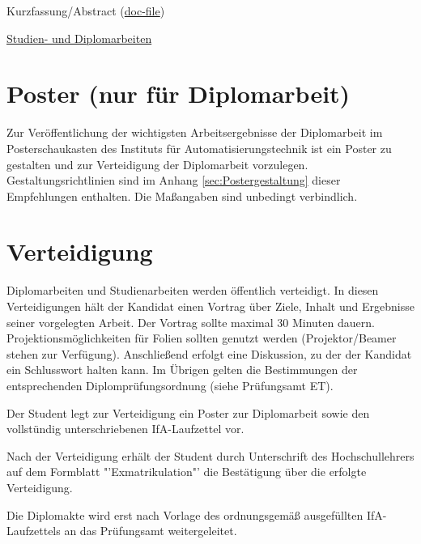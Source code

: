 \begin{compactitem}
  \item Kurzfassung/Abstract (\href{http://www.et.tu-dresden.de/ifa/fileadmin/user_upload/www_files/richtlinien_sa_da/DA_SA_Kurzfassung_Abstract.doc}{doc-file})
\end{compactitem}

\begin{compactitem}
  \item \href{http://www.et.tu-dresden.de/typo3/ifa/index.php?id=710}{Studien- und Diplomarbeiten }
\end{compactitem}


\section{Poster (nur für Diplomarbeit)}
\label{sec:PosterNurFuerDiplomarbeit}

Zur Veröffentlichung der wichtigsten Arbeitsergebnisse der Diplomarbeit im Posterschaukasten des Instituts für Automatisierungstechnik ist ein Poster zu gestalten und zur Verteidigung der Diplomarbeit vorzulegen. Gestaltungsrichtlinien sind im Anhang \ref{sec:Postergestaltung} dieser Empfehlungen enthalten. Die Maßangaben sind unbedingt verbindlich.


\section{Verteidigung}
\label{sec:Verteidigung}

Diplomarbeiten und Studienarbeiten werden öffentlich verteidigt. In diesen Verteidigungen hält der Kandidat einen Vortrag über Ziele, Inhalt und Ergebnisse seiner vorgelegten Arbeit. Der Vortrag sollte maximal 30 Minuten dauern. Projektionsmöglichkeiten für Folien sollten genutzt werden (Projektor/Beamer stehen zur Verfügung). Anschließend erfolgt eine Diskussion, zu der der Kandidat ein Schlusswort halten kann.
Im Übrigen gelten die Bestimmungen der entsprechenden Diplomprüfungsordnung (siehe Prüfungsamt ET).

\begin{compactitem}
  \item Der Student legt zur Verteidigung ein Poster zur Diplomarbeit sowie den vollstündig unterschriebenen IfA-Laufzettel vor.
  \item Nach der Verteidigung erhält der Student durch Unterschrift des Hochschullehrers auf dem Formblatt "'Exmatrikulation"' die Bestätigung über die erfolgte Verteidigung.
  \item Die Diplomakte wird erst nach Vorlage des ordnungsgemäß ausgefüllten IfA-Laufzettels an das Prüfungsamt weitergeleitet.
\end{compactitem}

